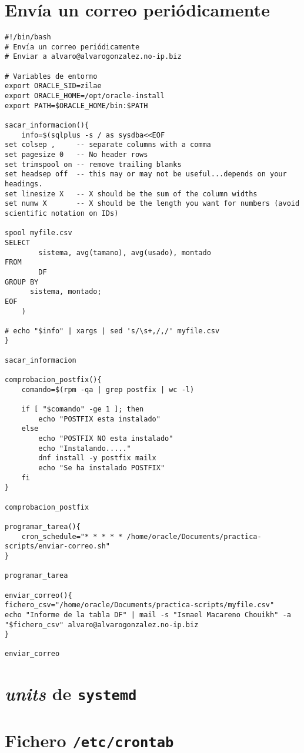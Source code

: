 \documentclass[11pt]{article}
\begin{document}
\section{Envía un correo periódicamente}
\label{sec:org8be3f67}
\begin{verbatim}
#!/bin/bash
# Envía un correo periódicamente
# Enviar a alvaro@alvarogonzalez.no-ip.biz

# Variables de entorno
export ORACLE_SID=zilae
export ORACLE_HOME=/opt/oracle-install
export PATH=$ORACLE_HOME/bin:$PATH

sacar_informacion(){
    info=$(sqlplus -s / as sysdba<<EOF
set colsep ,     -- separate columns with a comma
set pagesize 0   -- No header rows
set trimspool on -- remove trailing blanks
set headsep off  -- this may or may not be useful...depends on your headings.
set linesize X   -- X should be the sum of the column widths
set numw X       -- X should be the length you want for numbers (avoid scientific notation on IDs)

spool myfile.csv
SELECT
        sistema, avg(tamano), avg(usado), montado
FROM
        DF
GROUP BY
      sistema, montado;
EOF
    )

# echo "$info" | xargs | sed 's/\s+,/,/' myfile.csv 
}

sacar_informacion

comprobacion_postfix(){
    comando=$(rpm -qa | grep postfix | wc -l)

    if [ "$comando" -ge 1 ]; then
        echo "POSTFIX esta instalado"
    else
        echo "POSTFIX NO esta instalado"
        echo "Instalando....."
        dnf install -y postfix mailx
        echo "Se ha instalado POSTFIX"
    fi
}

comprobacion_postfix

programar_tarea(){
    cron_schedule="* * * * * /home/oracle/Documents/practica-scripts/enviar-correo.sh"
}

programar_tarea

enviar_correo(){
fichero_csv="/home/oracle/Documents/practica-scripts/myfile.csv"
echo "Informe de la tabla DF" | mail -s "Ismael Macareno Chouikh" -a "$fichero_csv" alvaro@alvarogonzalez.no-ip.biz
}

enviar_correo
\end{verbatim}

\section{\emph{units} de \texttt{systemd}}
\label{sec:orgd3ff2db}
 \newline

\section{Fichero \texttt{/etc/crontab}}
\label{sec:org6207534}
 \newline
\end{document}
